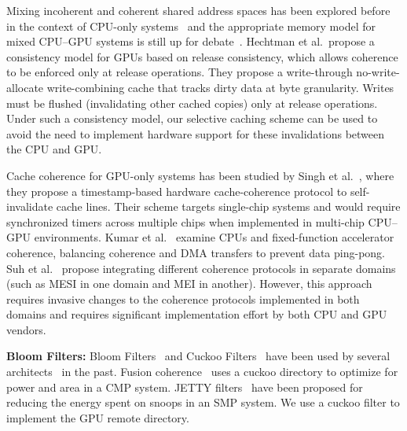 Mixing incoherent and coherent shared address spaces has been explored before in the context of
CPU-only systems~\cite{Huh04} and the appropriate memory model for mixed
CPU--GPU systems is still up for
debate~\cite{Lim2012,Hechtman2014,Hower2014,Gaster2015}.  Hechtman et al.~propose 
a consistency model for GPUs based on release consistency, which allows
coherence to be enforced only at release operations.  They propose a 
write-through no-write-allocate write-combining cache that tracks dirty data
at byte granularity.  Writes must be flushed (invalidating other cached copies) only 
at release operations.  Under such a consistency model, our selective caching scheme 
can be used to avoid the need to implement hardware support for these invalidations between
the CPU and GPU.

Cache coherence for GPU-only systems has been studied by
Singh et al.~\cite{Singh2013}, where they propose a timestamp-based hardware 
cache-coherence protocol to self-invalidate cache lines. Their scheme targets 
single-chip systems and would require synchronized timers across multiple 
chips when implemented in multi-chip CPU--GPU environments.
Kumar et al.~\cite{Kumar2015} examine CPUs and fixed-function accelerator
coherence, balancing coherence and DMA transfers to prevent data ping-pong.
Suh et al.~\cite{Suh2004} propose integrating different coherence
protocols in separate domains (such as MESI in one domain and MEI in another). 
However, this approach requires invasive changes to
the coherence protocols implemented in both domains and
requires significant implementation effort by both CPU and GPU vendors.

\textbf{Bloom Filters:} Bloom Filters~\cite{Bloom1970} and Cuckoo
Filters~\cite{Pagh2004,fan2014} have been used by several
architects~\cite{Strauss2006,Zebchuk2009,Hongzhou2011} in the past. Fusion
coherence~\cite{wu2014} uses a cuckoo directory to optimize for power and area in
a CMP system. JETTY filters~\cite{Moshovos2001} have been proposed for reducing
the energy spent on snoops in an SMP system. We use a cuckoo filter to implement
the GPU remote directory.
